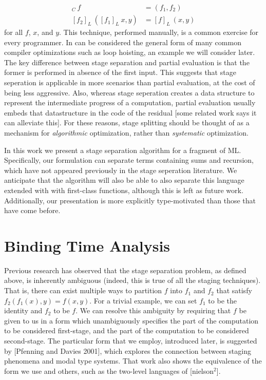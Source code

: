 \documentclass{article}
\begin{document}
\begin{itemize}
\begin{align*}
[pe]_C~f &= (f_1,f_2) \\
[f_2]_L~([f_1]_L~x,y) &= [f]_L~(x,y)
\end{align*}
for all $f$, $x$, and $y$.  This technique, performed manually, is a common exercise for every programmer.  In can be considered the general form of many common compiler optimizations such as loop hoisting, an example we will consider later.  The key difference between stage separation and partial evaluation is that the former is performed in absence of the first input.  This suggests that stage seperation is applicable in more scenarios than partial evaluation, at the cost of being less aggressive.  Also, whereas stage seperation creates a data structure to represent the intermediate progress of a computation, partial evaluation usually embeds that datastructure in the code of the residual [some related work says it can alleviate this].  For these reasons, stage splitting should be thought of as a mechanism for {\em algorithmic} optimization, rather than {\em systematic} optimization.
\end{itemize}
In this work we present a stage separation algorithm for a fragment of ML.  Specifically, our formulation can separate terms containing sums and recursion, which have not appeared previously in the stage seperation literature.  We anticipate that the algorithm will also be able to also separate this language extended with with first-class functions, although this is left as future work.  Additionally, our presentation is more explicitly type-motivated than those that have come before.

\section{Binding Time Analysis}
Previous research has observed that the stage separation problem, as defined above, is inherently ambiguous (indeed, this is true of all the staging techniques).  That is, there can exist multiple ways to partition $f$ into $f_1$ and $f_2$ that satisfy $f_2(f_1(x),y) = f(x,y)$.  For a trivial example, we can set $f_1$ to be the identity and $f_2$ to be $f$.  We can resolve this ambiguity by requiring that $f$ be given to us in a form which unambiguously specifies the part of the computation to be considered first-stage, and the part of the computation to be considered second-stage.  The particular form that we employ, introduced later, is suggested by [Pfenning and Davies 2001], which explores the connection between staging phenomena and modal type systems.  That work also shows the equivalence of the form we use and others, such as the two-level languages of [nielson$^2$].  
\end{document}
